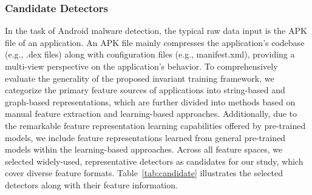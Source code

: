 \subsubsection{Candidate Detectors}
In the task of Android malware detection, the typical raw data input is the APK file of an application. An APK file mainly compresses the application's codebase (e.g., .dex files) along with configuration files (e.g., manifest.xml), providing a multi-view perspective on the application's behavior. To comprehensively evaluate the generality of the proposed invariant training framework, we categorize the primary feature sources of applications into string-based and graph-based representations, which are further divided into methods based on manual feature extraction and learning-based approaches. Additionally, due to the remarkable feature representation learning capabilities offered by pre-trained models, we include feature representations learned from general pre-trained models within the learning-based approaches. Across all feature spaces, we selected widely-used, representative detectors as candidates for our study, which cover diverse feature formats. Table~\ref{tab:candidate} illustrates the selected detectors along with their feature information.
